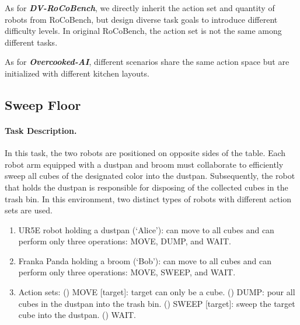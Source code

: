 \documentclass[11pt]{article}
\theoremstyle{plain}
\theoremstyle{remark}
\begin{document}
As for \textbf{\emph{DV-RoCoBench}}, we directly inherit the action set and quantity of robots from RoCoBench, but design diverse task goals to introduce different difficulty levels. In original RoCoBench, the action set is not the same among different tasks.

As for \textbf{\emph{Overcooked-AI}}, different scenarios share the same action space but are initialized with different kitchen layouts.


\subsection{Sweep Floor}

\paragraph{Task Description.}
In this task, the two robots are positioned on opposite sides of the table. Each robot arm equipped with a dustpan and broom must collaborate to efficiently sweep all cubes of the designated color into the dustpan. Subsequently, the robot that holds the dustpan is responsible for disposing of the collected cubes in the trash bin. In this environment, two distinct types of robots with different action sets are used.
\begin{enumerate}
\item UR5E robot holding a dustpan (‘Alice’): can move to all cubes and can perform only three operations: MOVE, DUMP, and WAIT.
\item Franka Panda holding a broom (‘Bob’): can move to all cubes and can perform only three operations: MOVE, SWEEP, and WAIT.
\item Action sets: () MOVE [target]: target can only be a cube. () DUMP: pour all cubes in the dustpan into the trash bin. () SWEEP [target]: sweep the target cube into the dustpan. () WAIT.
\end{enumerate}
\end{document}

